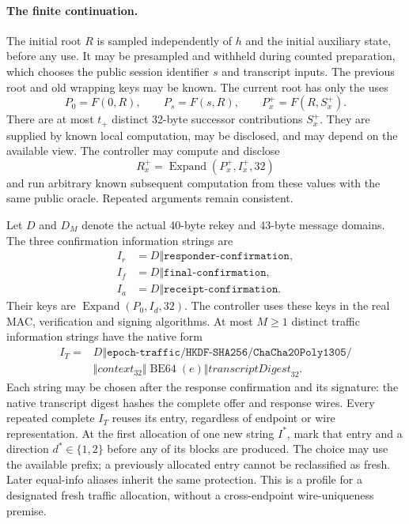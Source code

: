 \paragraph{The finite continuation.}
The initial root $R$ is sampled independently of $h$ and the initial
auxiliary state, before any use. It may be presampled and withheld during
counted preparation, which chooses the public session identifier $s$ and
transcript inputs. The previous root and old wrapping keys may be known.
The current root has only the uses
\begin{equation}
 P_0=F(0,R),\qquad P_s=F(s,R),\qquad P_x^+=F(R,S_x^+).
 \label{eq:joint-root-uses}
\end{equation}
There are at most $t_+$ distinct 32-byte successor contributions $S_x^+$.
They are supplied by known local computation, may be disclosed, and may
depend on the available view. The controller may compute and disclose
\[
 R_x^+=\operatorname{Expand}(P_x^+,I_x^+,32)
\]
and run arbitrary known subsequent computation from these values with the
same public oracle. Repeated arguments remain consistent.

Let $D$ and $D_M$ denote the actual 40-byte rekey and 43-byte message domains.
The three confirmation information strings are
\[
\begin{aligned}
 I_r&=D\Vert\texttt{responder-confirmation},\\
 I_f&=D\Vert\texttt{final-confirmation},\\
 I_a&=D\Vert\texttt{receipt-confirmation}.
\end{aligned}
\]
Their keys are $\operatorname{Expand}(P_0,I_d,32)$. The controller uses
these keys in the real MAC, verification and signing algorithms.
At most $M\ge1$ distinct traffic information strings have the native form
\begin{equation}
\begin{split}
 I_T={}&D\Vert\texttt{epoch-traffic/HKDF-SHA256/ChaCha20Poly1305/}\\
 &\Vert\mathit{context}_{32}\Vert\operatorname{BE64}(e)
 \Vert\mathit{transcriptDigest}_{32}.
\end{split}
 \label{eq:joint-traffic-info}
\end{equation}
Each string may be chosen after the response confirmation and its signature: the
native transcript digest hashes the complete offer and response wires.
Every repeated complete $I_T$ reuses its entry, regardless of endpoint or
wire representation. At the first allocation of one new string $I^*$,
mark that entry and a direction $d^*\in\{1,2\}$ before any of its blocks
are produced. The choice may use the available prefix; a previously
allocated entry cannot be reclassified as fresh. Later equal-info
aliases inherit the same protection. This is a profile for a designated
fresh traffic allocation, without a cross-endpoint wire-uniqueness premise.

